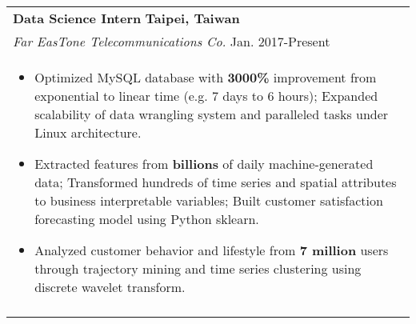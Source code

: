 \documentclass[a4paper,11pt]{article} %
\begin{document}
{\begin{tabular}{p{18.5cm}}
{\bf{Data Science Intern}} \hfill \bf{Taipei, Taiwan}\\
{\it Far EasTone Telecommunications Co.} \hfill  Jan. 2017-Present\\%
\begin{itemize}
\vspace{-3mm}
\item Optimized MySQL database with {\bf3000\%} improvement from exponential to linear time (e.g. 7 days to 6 hours); Expanded scalability of data wrangling system and paralleled tasks under Linux architecture.
\item Extracted features from {\bf billions} of daily machine-generated data; Transformed hundreds of time series and spatial attributes to business interpretable variables; Built customer satisfaction forecasting model using Python sklearn. 
\item Analyzed customer behavior and lifestyle from {\bf7 million} users through trajectory mining and time series clustering using discrete wavelet transform.\vspace*{-\baselineskip}
\end{itemize} \\ 
\vspace{0.5mm}


\end{tabular}}
\end{document}
